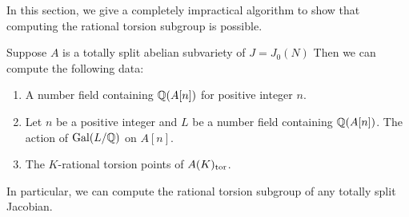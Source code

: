 \documentclass[11pt, proquest]{uwthesis}
\begin{document}
In this section, we give a completely impractical algorithm to show that
computing the rational torsion subgroup is possible.
\begin{proposition}
    Suppose $A$ is a totally split abelian subvariety of $J=J_0(N)$ Then we can
    compute the following data:
    \begin{enumerate}
        \item
            A number field containing $\mathbb{Q}(A[n])$ for positive integer $n$.
        \item
            Let $n$ be a positive integer and $L$ be a number field containing
            $\mathbb{Q}(A[n])$. The action of $\operatorname{Gal}(L/\mathbb{Q})$ on $A[n]$.
        \item 
            The $K$-rational torsion points of $A(K)_{\mathrm{tor}}$.
    \end{enumerate}
    In particular, we can compute the rational torsion subgroup of any totally
    split Jacobian.
\end{proposition}
\end{document}

